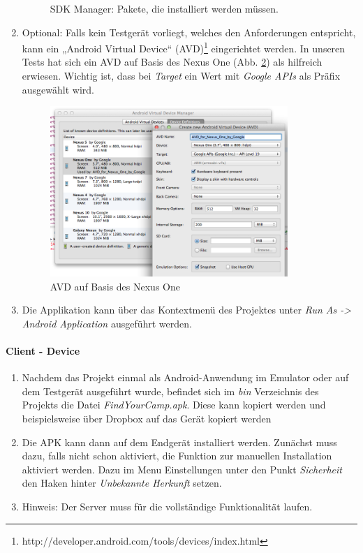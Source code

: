 \begin{enumerate}
\begin{figure}[H]
		\caption{SDK Manager: Pakete, die installiert werden müssen.}
		\label{fg:android-sdk-manager}
	\end{figure}
	\item Optional: Falls kein Testgerät vorliegt, welches den Anforderungen entspricht, kann ein „Android Virtual Device“ (AVD)\footnote{http://developer.android.com/tools/devices/index.html} eingerichtet werden. In unseren Tests hat sich ein AVD auf Basis des Nexus One (Abb. \ref{fg:android-adv}) als hilfreich erwiesen. Wichtig ist, dass bei \textit{Target} ein Wert mit \textit{Google APIs} als Präfix ausgewählt wird.
	\begin{figure}[H]
		\centering
		\includegraphics[width=0.85\textwidth]{./images/install/android-avd.png}
		\caption{AVD auf Basis des Nexus One}
		\label{fg:android-adv}
	\end{figure}
	\item Die Applikation kann über das Kontextmenü des Projektes unter \textit{Run As -> Android Application} ausgeführt werden.
\end{enumerate}


\paragraph{Client - Device}

\begin{enumerate}
	\item Nachdem das Projekt einmal als Android-Anwendung im Emulator oder auf dem Testgerät ausgeführt wurde, befindet sich im \textit{bin} Verzeichnis des Projekts die Datei \textit{FindYourCamp.apk}. Diese kann kopiert werden und beispielsweise über Dropbox auf das Gerät kopiert werden
	\item Die APK kann dann auf dem Endgerät installiert werden. Zunächst muss dazu, falls nicht schon aktiviert, die Funktion zur manuellen Installation aktiviert werden. Dazu im Menu Einstellungen unter den Punkt \textit{Sicherheit} den Haken hinter \textit{Unbekannte Herkunft} setzen.
	\item Hinweis: Der Server muss für die vollständige Funktionalität laufen.
\end{enumerate}

